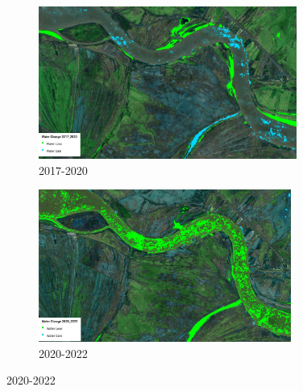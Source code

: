 \begin{figure}[H]
    \centering
    \begin{subfigure}[b]{0.48\textwidth}
        \includegraphics[width=\linewidth, height =5cm]{figures/appendix-g/2017-2020.jpg}
        \caption{2017-2020}
        \label{fig:second}
    \end{subfigure}
    \hfill
    \begin{subfigure}[b]{0.48\textwidth}
        \includegraphics[width=\linewidth, height =5cm]{figures/ch5/2020-2022.jpg}
        \caption{2020-2022}
        \label{fig:second}
    \end{subfigure}
    

    \vspace{0.5cm}


\end{figure}
